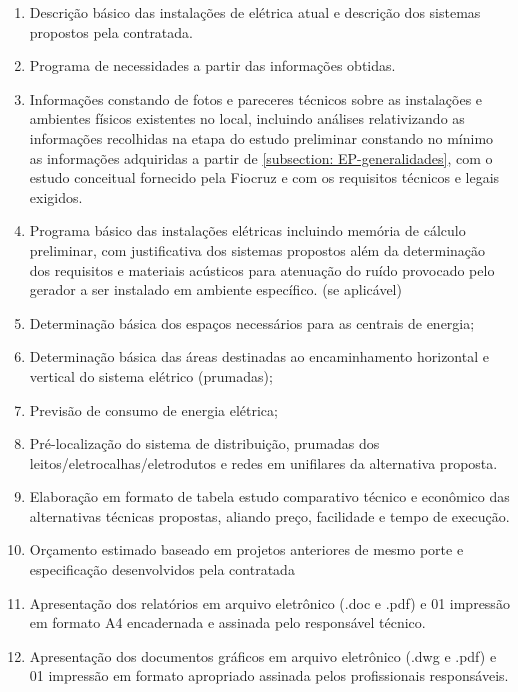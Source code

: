 \begin{enumerate}
\begin{enumerate}
			\item Descrição básico das instalações de elétrica atual e descrição dos sistemas propostos pela contratada.
			
			\item Programa de necessidades a partir das informações obtidas.

			\item Informações constando de fotos e pareceres técnicos sobre as instalações e ambientes físicos existentes no local, incluindo análises relativizando as informações recolhidas na etapa do estudo preliminar constando no mínimo as informações adquiridas a partir de \ref{subsection: EP-generalidades}, com o estudo conceitual fornecido pela Fiocruz e com os requisitos técnicos e legais exigidos.
			
			\item Programa básico das instalações elétricas incluindo memória de cálculo preliminar, com justificativa dos sistemas propostos além da determinação dos requisitos e materiais acústicos para atenuação do ruído provocado pelo gerador a ser instalado em ambiente específico. (se aplicável)			
			
			\item Determinação básica dos espaços necessários para as centrais de energia;
			
			\item Determinação básica das áreas destinadas ao encaminhamento horizontal e vertical do sistema elétrico (prumadas);
			
			\item Previsão de consumo de energia elétrica;
			
			\item Pré-localização do sistema de distribuição, prumadas dos leitos/eletrocalhas/eletrodutos e redes em unifilares da alternativa proposta.

			\item Elaboração em formato de tabela estudo comparativo técnico e econômico das alternativas técnicas propostas, aliando preço, facilidade e tempo de execução.
			
			\item Orçamento estimado baseado em projetos anteriores de mesmo porte e especificação desenvolvidos pela contratada
			
			\item Apresentação dos relatórios em arquivo eletrônico (.doc e .pdf) e 01 impressão em formato A4 encadernada e assinada pelo responsável técnico.
			
			\item Apresentação dos documentos gráficos em arquivo eletrônico (.dwg e .pdf) e 01 impressão em formato apropriado assinada pelos profissionais responsáveis.

		\end{enumerate}
	
\end{enumerate}
